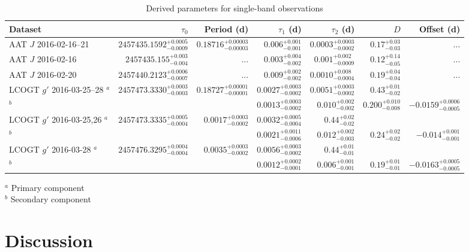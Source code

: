 \documentclass[useAMS,usenatbib]{mn2e}
\begin{document}
\begin{table}
    \caption{Derived parameters for single-band observations}
    \label{tab:single_obs}
    \centering
    \begin{tabular}{lrrrrrr}
    \hline\hline
        Dataset & $\tau_0$ & Period (d) & $\tau_1$ (d) & $\tau_2$ (d) & $D$ & Offset (d) \\
    \hline
        AAT $J$ 2016-02-16--21 & $2457435.1592_{-0.0009}^{+0.0005}$ & $0.18716_{-0.00003}^{+0.00003}$ & $0.006_{-0.001}^{+0.001}$ & $0.0003_{-0.0002}^{+0.0003}$ & $0.17_{-0.03}^{+0.03}$ & ... \\
        AAT $J$ 2016-02-16 & $2457435.155_{-0.004}^{+0.003}$ & ... & $0.003_{-0.002}^{+0.004}$ & $0.001_{-0.0009}^{+0.002}$ & $0.12_{-0.05}^{+0.14}$ & ...\\
        AAT $J$ 2016-02-20 & $2457440.2123_{-0.0007}^{+0.0006}$ & ... & $0.009_{-0.002}^{+0.002}$ & $0.0010_{-0.0004}^{+0.008}$ & $0.19_{-0.04}^{+0.04}$ & ...\\
        LCOGT $g'$ 2016-03-25--28 $^a$& $2457473.3330_{-0.0003}^{+0.0003}$ & $0.18727_{-0.00001}^{+0.00001}$ & $0.0027_{-0.0002}^{+0.0003}$ & $0.0051_{-0.0002}^{+0.0003}$ & $0.43_{-0.02}^{+0.01}$ & \\
        $^b$&&& $0.0013_{-0.0002}^{+0.0003}$ & $0.010_{-0.002}^{+0.002}$ & $0.200_{-0.008}^{+0.010}$ & $-0.0159_{-0.0005}^{+0.0006}$\\ 
        LCOGT $g'$ 2016-03-25,26 $^a$ & $2457473.3335_{-0.0004}^{+0.0005}$ & $0.0017_{-0.0002}^{+0.0003}$ & $0.0032_{-0.0004}^{+0.0005}$ & $0.44_{-0.02}^{+0.02}$ & \\
        $^b$ &&& $0.0021_{-0.0006}^{+0.0011}$ & $0.012_{-0.003}^{+0.002}$ & $0.24_{-0.02}^{+0.02}$ & $-0.014_{-0.001}^{+0.001}$\\ 
        LCOGT $g'$ 2016-03-28 $^a$& $2457476.3295_{-0.0004}^{+0.0004}$ & $0.0035_{-0.0002}^{+0.0003}$ & $0.0056_{-0.0002}^{+0.0003}$ & $0.44_{-0.01}^{+0.01}$ & \\
        $^b$ &&& $0.0012_{-0.0001}^{+0.0002}$ & $0.006_{-0.001}^{+0.001}$ & $0.19_{-0.01}^{+0.01}$ & $-0.0163_{-0.0005}^{+0.0005}$\\         
    \hline
    \end{tabular}
    \begin{flushleft}
    $^a$ Primary component\\
    $^b$ Secondary component
    \end{flushleft}
\end{table}

\section{Discussion}
\label{sec:discussion}
\end{document}
